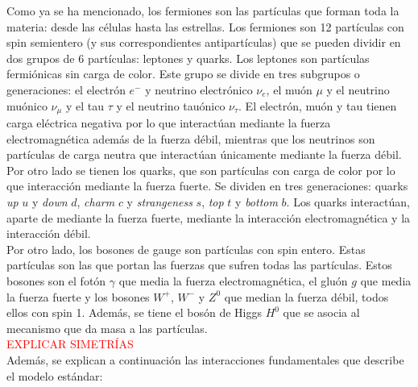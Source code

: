  Como ya se ha mencionado, los fermiones son las partículas que forman toda la materia: desde las células hasta las estrellas. Los fermiones son 12 partículas con spin semientero (y sus correspondientes antipartículas) que se pueden dividir en dos grupos de 6 partículas: leptones y quarks. Los leptones son partículas fermiónicas sin carga de color. Este grupo se divide en tres subgrupos o generaciones: el electrón $e^-$ y neutrino electrónico $\nu_e$, el muón $\mu$ y el neutrino muónico $\nu_\mu$ y el tau $\tau$ y el neutrino tauónico $\nu_\tau$. El electrón, muón y tau tienen carga eléctrica negativa por lo que interactúan mediante la fuerza electromagnética además de la fuerza débil, mientras que los neutrinos son partículas de carga neutra que interactúan únicamente mediante la fuerza débil. Por otro lado se tienen los quarks, que son partículas con carga de color por lo que interacción mediante la fuerza fuerte. Se dividen en tres generaciones: quarks \textit{up} $u$ y \textit{down} $d$, \textit{charm} $c$ y \textit{strangeness} $s$, \textit{top} $t$ y \textit{bottom} $b$. Los quarks interactúan, aparte de mediante la fuerza fuerte, mediante la interacción electromagnética y la interacción débil. \\

 Por otro lado, los bosones de gauge son partículas con spin entero. Estas partículas son las que portan las fuerzas que sufren todas las partículas. Estos bosones son el fotón $\gamma$ que media la fuerza electromagnética, el gluón $g$ que media la fuerza fuerte y los bosones $W^+$, $W^-$ y $Z^0$ que median la fuerza débil, todos ellos con spin 1. Además, se tiene el bosón de Higgs $H^0$ que se asocia al mecanismo que da masa a las partículas.  \\

\textcolor{red}{EXPLICAR SIMETRÍAS}\\
Además, se explican a continuación las interacciones fundamentales que describe el modelo estándar:\\

